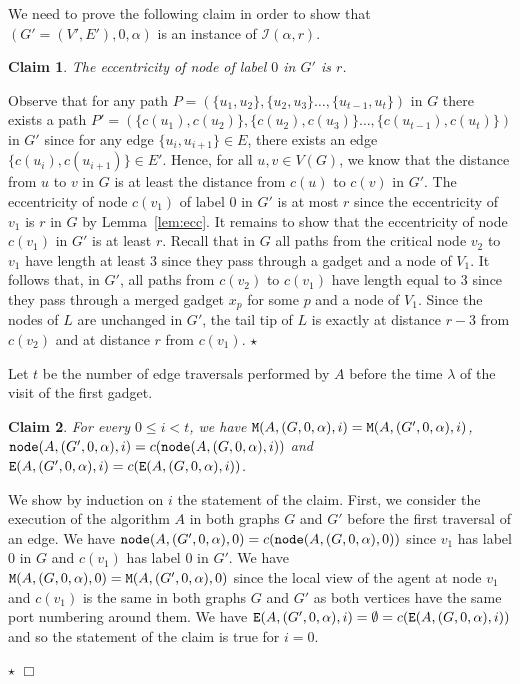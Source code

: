 \documentclass[11pt]{article}
\newtheorem{claim}{Claim}[section]
\newcommand{\qed}{\hfill $\Box$ \bigbreak}
\newenvironment{proof}{\noindent {\bf Proof.}}{\qed}
\newenvironment{proofclaim}{\noindent{\bf Proof of the claim.}}{\hfill$\star$}
\begin{document}
{\begin{proof}
We need to prove the following claim in order to show that $(G'=(V',E'),0,\alpha)$ is an instance of $\mathcal{I}(\alpha,r)$.

\begin{claim}
  The eccentricity of node of label $0$ in $G'$ is $r$.
\end{claim}

\begin{proofclaim}
Observe that for any path $P=(\{u_1,u_2\},\{u_2,u_3\}\dots, \{u_{t-1},u_t\})$ in $G$ there exists a path $P'=(\{c(u_1),c(u_2)\},\{c(u_2),c(u_3)\}\dots, \{c(u_{t-1}),c(u_t)\})$ in $G'$ since for any edge $\{u_i,u_{i+1}\}\in E$, there exists an edge $\{c(u_i),c(u_{i+1})\}\in E'$. Hence, for all $u,v\in V(G)$, we know that the distance from $u$ to $v$ in $G$ is at least the distance from $c(u)$ to $c(v)$ in $G'$. The eccentricity of node $c(v_1)$ of label $0$ in $G'$ is at most $r$ since the eccentricity of $v_1$ is $r$ in $G$ by Lemma~\ref{lem:ecc}. It remains to show that the eccentricity of node $c(v_1)$ in $G'$ is at least $r$. Recall that in $G$ all paths from the critical node $v_2$ to $v_1$ have length at least 3 since they pass through a gadget and a node of $V_1$. It follows that, in $G'$, all paths from $c(v_2)$ to $c(v_1)$ have length equal to 3 since they pass through a merged gadget $x_p$ for some $p$ and a node of $V_1$. Since the nodes of $L$ are unchanged in $G'$, the tail tip of $L$ is exactly at distance $r - 3$ from $c(v_2)$ and at distance $r$ from $c(v_1)$.
\end{proofclaim}

Let $t$ be the number of edge traversals performed by $A$ before the time $\lambda$ of the visit of the first gadget.
\begin{claim}\label{claim:same_behavior_merged_graph}
For every $0\leq i<t$, we have ${\tt M}(A,(G,0,\alpha),i)={\tt M}(A,(G',0,\alpha),i)$, 
${\tt node}(A,(G',0,\alpha),i)=c({\tt node}(A,(G,0,\alpha),i))$  and ${\tt E}(A,(G',0,\alpha),i)=c({\tt E}(A,(G,0,\alpha),i))$.
\end{claim}

\begin{proofclaim}
We show by induction on $i$ the statement of the claim. First, we consider the execution of the algorithm $A$ in both graphs $G$ and $G'$ before the first traversal of an edge. We have ${\tt node}(A,(G',0,\alpha),0)=c({\tt node}(A,(G,0,\alpha),0))$ since $v_1$ has label $0$ in $G$ and $c(v_1)$ has label $0$ in $G'$. We have ${\tt M}(A,(G,0,\alpha),0)={\tt M}(A,(G',0,\alpha),0)$ since the local view of the agent at node $v_1$ and $c(v_1)$ is the same in both graphs $G$ and $G'$ as both vertices have the same port numbering around them. We have ${\tt E}(A,(G',0,\alpha),i)=\emptyset=c({\tt E}(A,(G,0,\alpha),i))$ and so the statement of the claim is true for $i=0$. 


\end{proofclaim}
\end{proof}}
\end{document}
